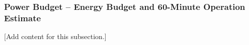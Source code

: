 
\subsubsection{Power Budget -- Energy Budget and 60-Minute Operation Estimate}
\label{subsubsec:design_3_3_power_budget_60min_operation}

[Add content for this subsection.]
